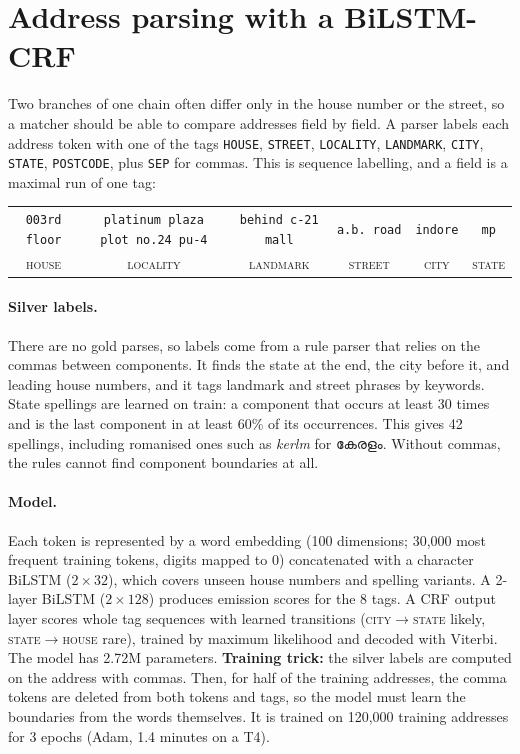 \section{Address parsing with a BiLSTM-CRF}
\label{sec:parsing}

Two branches of one chain often differ only in the house number or the street, so a matcher should be able
to compare addresses field by field. A parser labels each address token with one of the tags
\texttt{HOUSE}, \texttt{STREET}, \texttt{LOCALITY}, \texttt{LANDMARK}, \texttt{CITY}, \texttt{STATE}, \texttt{POSTCODE},
plus \texttt{SEP} for commas. This is sequence labelling, and a field is a maximal run of one tag:

\begin{center}\small
\begin{tabular}{cccccc}
\texttt{003rd floor} & \texttt{platinum plaza plot no.24 pu-4} & \texttt{behind c-21 mall} & \texttt{a.b.\ road} & \texttt{indore} & \texttt{mp} \\
\textsc{house} & \textsc{locality} & \textsc{landmark} & \textsc{street} & \textsc{city} & \textsc{state}
\end{tabular}
\end{center}

\paragraph{Silver labels.} There are no gold parses, so labels come from a rule parser that relies on the
commas between components. It finds the state at the end, the city before it, and leading house numbers,
and it tags landmark and street phrases by keywords. State spellings are learned on train: a component
that occurs at least 30 times and is the last component in at least 60\% of its occurrences. This gives 42
spellings, including romanised ones such as \emph{kerlm} for {\mlym കേരളം}. Without commas, the rules
cannot find component boundaries at all.

\paragraph{Model.} Each token is represented by a word embedding (100 dimensions; 30,000 most frequent
training tokens, digits mapped to 0) concatenated with a character BiLSTM ($2\times32$), which covers unseen
house numbers and spelling variants. A 2-layer BiLSTM ($2\times128$) produces emission scores for the 8 tags.
A CRF output layer scores whole tag sequences with learned transitions
(\textsc{city}$\to$\textsc{state} likely, \textsc{state}$\to$\textsc{house} rare), trained by maximum
likelihood and decoded with Viterbi. The model has 2.72M
parameters. \textbf{Training trick:} the silver labels are computed on the address with commas. Then, for
half of the training addresses, the comma tokens are deleted from both tokens and tags, so the model must
learn the boundaries from the words themselves. It is trained on 120,000 training addresses for 3 epochs
(Adam, 1.4 minutes on a T4).

